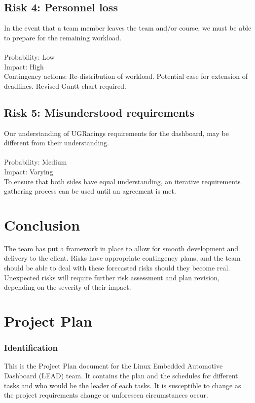 \documentclass{article}
\begin{document}
\subsection{Risk 4: Personnel loss}
In the event that a team member leaves the team and/or course, we must be able 
to prepare for the remaining workload.\\
\\
Probability: Low\\
Impact: High\\
Contingency actions: Re-distribution of workload. Potential case for extension 
of deadlines. Revised Gantt chart required.

\subsection{Risk 5: Misunderstood requirements}
Our understanding of UGRacings requirements for the dashboard, may be different 
from their understanding. \\
\\
Probability: Medium\\
Impact: Varying\\
To ensure that both sides have equal understanding, an iterative requirements 
gathering process can be used until an agreement is met.

\section{Conclusion}
The team has put a framework in place to allow for smooth development and 
delivery to the client. Risks have appropriate contingency plans, and the team 
should be able to deal with these forecasted risks should they become real. 
Unexpected risks will require further risk assessment and plan revision, 
depending on the severity of their impact.


\section{Project Plan}

\subsubsection{Identification}

This is the Project Plan document for the Linux Embedded Automotive Dashboard (LEAD) team. It contains the plan and the schedules for different tasks and who would be the leader of each tasks. It is susceptible to change as the project requirements change or unforeseen circumstances occur.
 
\end{document}
